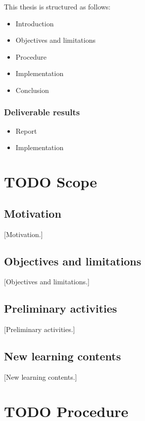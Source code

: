 \documentclass[10pt, openright, notitlepage]{scrreprt}
\begin{document}
This thesis is structured as follows:

\begin{itemize}
\item Introduction
\item Objectives and limitations
\item Procedure
\item Implementation
\item Conclusion
\end{itemize}

\subsection{Deliverable results}
\label{sec:org319c3c7}

\begin{itemize}
\item Report
\item Implementation
\end{itemize}
\chapter{{\bfseries\sffamily TODO} Scope}
\label{sec:orgc36d824}
\section{Motivation}
\label{sec:orgd76e0a4}

[Motivation.]

\section{Objectives and limitations}
\label{sec:orgd018d94}

[Objectives and limitations.]

\section{Preliminary activities}
\label{sec:org2ea8683}

[Preliminary activities.]

\section{New learning contents}
\label{sec:org94da795}

[New learning contents.]
\chapter{{\bfseries\sffamily TODO} Procedure}
\label{sec:org837a250}
\end{document}
